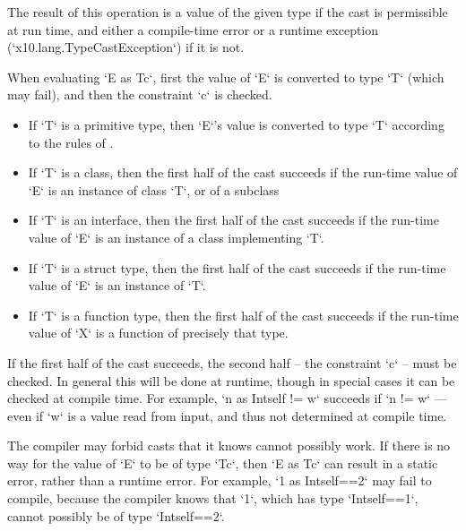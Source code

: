 The result of this operation is a value of the given type if the cast
is permissible at run time, and either a compile-time error or a runtime
exception 
(\xcd`x10.lang.TypeCastException`) if it is not.  

When evaluating \xcd`E as T{c}`, first the value of \xcd`E` is converted to
type \xcd`T` (which may fail), and then the constraint \xcd`{c}` is checked. 



\begin{itemize}
\item If \xcd`T` is a primitive type, then \xcd`E`'s value is converted to type
      \xcd`T` according to the rules of
      . 
      
\item If \xcd`T` is a class, then the first half of the cast succeeds if the
      run-time value of \xcd`E` is an instance of class \xcd`T`, or of a
      subclass 

\item If \xcd`T` is an interface, then the first half of the cast succeeds if
      the run-time value of \xcd`E` is an instance of a class implementing
      \xcd`T`. 

\item If \xcd`T` is a struct type, then the first half of the cast succeeds if
      the run-time value of \xcd`E` is an instance of \xcd`T`.  

\item If \xcd`T` is a function type, then the first half of the cast succeeds
      if the run-time value of \xcd`X` is a function of precisely that type.
\end{itemize}

If the first half of the cast succeeds, the second half -- the constraint
\xcd`{c}` -- must be checked.  In general this will be done at runtime, though
in special cases it can be checked at compile time.   For example, 
\xcd`n as Int{self != w}` succeeds if \xcd`n != w` --- even if \xcd`w` is a value
read from input, and thus not determined at compile time.

The compiler may forbid casts that it knows cannot possibly work. If there is
no way for the value of \xcd`E` to be of type \xcd`T{c}`, then 
\xcd`E as T{c}` can result in a static error, rather than a runtime error.  
For example, \xcd`1 as Int{self==2}` may fail to compile, because the compiler
knows that \xcd`1`, which has type \xcd`Int{self==1}`, cannot possibly be of
type \xcd`Int{self==2}`. 


